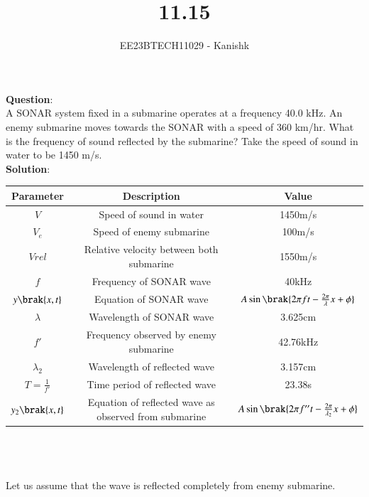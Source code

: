 \documentclass[journal,12pt,onecolumn]{IEEEtran}
\theoremstyle{remark}
\begin{document}

\vspace{3cm}

\title{11.15}
\author{EE23BTECH11029 - Kanishk}
\maketitle

\bigskip

\renewcommand{\thefigure}{\theenumi}
\renewcommand{\thetable}{\theenumi}
\footnotesize
\textbf{Question}:\\ 

A SONAR system fixed in a submarine operates at a frequency 40.0 kHz. An enemy submarine moves towards the SONAR with a speed of 360 km/hr. What is the frequency of sound reflected by the submarine? Take the speed of sound in water to be 1450 m/s.\\

\textbf{Solution}:\\


\begin{tabular}{|c|c|c|}
   
   \hline
   Parameter & Description & Value\\
   \hline
   $V $& Speed of sound in water & 1450m/s\\
   \hline 
   $V_e$ & Speed of enemy submarine & 100m/s\\
   \hline 
   $Vrel$ & Relative velocity between both submarine & 1550m/s\\
   \hline
   $f $& Frequency of SONAR wave & 40kHz\\ 
   \hline
   $y\brak{x,t}$ & Equation of SONAR wave & $A\sin\brak{2\pi ft-\frac{2\pi}{\lambda}x+\phi}$\\
   \hline
   $\lambda$ & Wavelength of SONAR wave & 3.625cm\\
    \hline
   $ f' $& Frequency observed by enemy submarine & 42.76kHz\\
   \hline
   $\lambda_2$ & Wavelength of reflected wave & 3.157cm\\
   \hline 
   $T=\frac{1}{f'}$ & Time period of reflected wave & 23.38s\\
   \hline
  $ y_2\brak{x,t}$ & Equation of reflected wave as observed from submarine& $A\sin\brak{2\pi f''t-\frac{2\pi}{\lambda_2}x+\phi}$\\
   \hline
   
\end{tabular}   
\\
\\
\\
Let us assume that the wave is reflected completely from enemy submarine.
\end{document}
